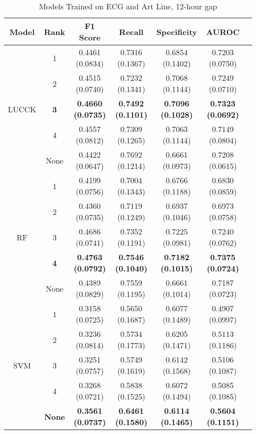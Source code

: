 \begin{table}
    \centering
    \caption{Models Trained on ECG and Art Line, 12-hour gap}
    \begin{tabular}{|c|c|c|c|c|c|c|}
        \hline
        Model & Rank & F1 Score & Recall & Specificity & AUROC \\
        \hline
         & 1 & 0.4461 (0.0834) & 0.7316 (0.1367) & 0.6854 (0.1402) & 0.7203 (0.0750)\\
         & 2 & 0.4515 (0.0740) & 0.7232 (0.1341) & 0.7068 (0.1144) & 0.7249 (0.0710)\\
        LUCCK & \textbf{3} & \textbf{0.4660 (0.0735)} & \textbf{0.7492 (0.1101)} & \textbf{0.7096 (0.1028)} & \textbf{0.7323 (0.0692)}\\
         & 4 & 0.4557 (0.0812) & 0.7309 (0.1265) & 0.7063 (0.1144) & 0.7149 (0.0804)\\
         & None & 0.4422 (0.0647) & 0.7692 (0.1214) & 0.6661 (0.0973) & 0.7208 (0.0615)\\
        \hline
         & 1 & 0.4199 (0.0756) & 0.7004 (0.1343) & 0.6766 (0.1188) & 0.6830 (0.0859)\\
         & 2 & 0.4360 (0.0735) & 0.7119 (0.1249) & 0.6937 (0.1046) & 0.6973 (0.0758)\\
        RF & 3 & 0.4686 (0.0741) & 0.7352 (0.1191) & 0.7225 (0.0981) & 0.7240 (0.0762)\\
         & \textbf{4} & \textbf{0.4763 (0.0792)} & \textbf{0.7546 (0.1040)} & \textbf{0.7182 (0.1015)} & \textbf{0.7375 (0.0724)}\\
         & None & 0.4389 (0.0829) & 0.7559 (0.1195) & 0.6661 (0.1014) & 0.7187 (0.0723)\\
        \hline
         & 1 & 0.3158 (0.0725) & 0.5650 (0.1687) & 0.6077 (0.1489) & 0.4907 (0.0997)\\
         & 2 & 0.3236 (0.0814) & 0.5734 (0.1773) & 0.6205 (0.1471) & 0.5113 (0.1186)\\
        SVM & 3 & 0.3251 (0.0757) & 0.5749 (0.1619) & 0.6142 (0.1568) & 0.5106 (0.1087)\\
         & 4 & 0.3268 (0.0721) & 0.5838 (0.1525) & 0.6072 (0.1494) & 0.5085 (0.1085)\\
         & \textbf{None} & \textbf{0.3561 (0.0737)} & \textbf{0.6461 (0.1580)} & \textbf{0.6114 (0.1465)} & \textbf{0.5604 (0.1151)}\\
         \hline
    \end{tabular}
\end{table}

